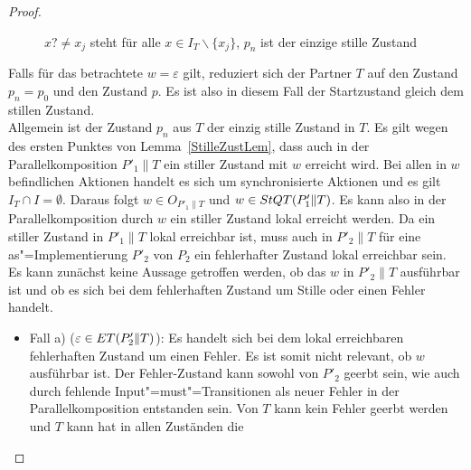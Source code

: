 \begin{proof}
\begin{figure} [h!tbp]
\begin{center}
    \caption{$x?\neq x_j$ steht für alle $x\in I_T\backslash\{x_j\}$, $p_n$
    ist der einzige stille Zustand}
  \label{TohneEmitI}
  \end{center}
  \end{figure}
  Falls für das betrachtete $w=\varepsilon$ gilt, reduziert sich der Partner
  $T$ auf den Zustand $p_n=p_0$ und den Zustand $p$. Es ist also in diesem Fall
  der Startzustand gleich dem stillen Zustand.\\
  Allgemein ist der Zustand $p_n$ aus $T$ der einzig stille Zustand in $T$. Es
  gilt wegen des ersten Punktes von Lemma~\ref{StilleZustLem}, dass auch in der
  Parallelkomposition $P'_1\|T$ ein stiller Zustand mit $w$ erreicht wird. Bei
  allen in $w$ befindlichen Aktionen handelt es sich um synchronisierte
  Aktionen und es gilt $I_T\cap I=\emptyset$. Daraus folgt $w\in O_{P'_1\|T}$
  und $w\in StQT (P'_1\|T)$. Es kann also in der Parallelkomposition durch $w$
  ein stiller Zustand lokal erreicht werden. Da ein stiller Zustand in
  $P'_1\|T$ lokal erreichbar ist, muss auch in $P'_2\|T$ für eine
  as"=Implementierung $P'_2$ von $P_2$ ein fehlerhafter Zustand lokal
  erreichbar sein. Es kann zunächst keine Aussage getroffen werden, ob das $w$
  in $P'_2\|T$ ausführbar ist und ob es sich bei dem fehlerhaften Zustand um
  Stille oder einen Fehler handelt.
  \begin{itemize}
    \item Fall a) ($\varepsilon\in ET (P'_2\|T)$): Es handelt sich bei dem
      lokal erreichbaren fehlerhaften Zustand um einen Fehler. Es ist somit
      nicht relevant, ob $w$ ausführbar ist. Der Fehler-Zustand kann sowohl von
      $P'_2$ geerbt sein, wie auch durch fehlende Input"=must"=Transitionen als
      neuer Fehler in der Parallelkomposition entstanden sein. Von $T$ kann
      kein Fehler geerbt werden und $T$ kann hat in allen Zuständen die

\end{itemize}
\end{proof}
